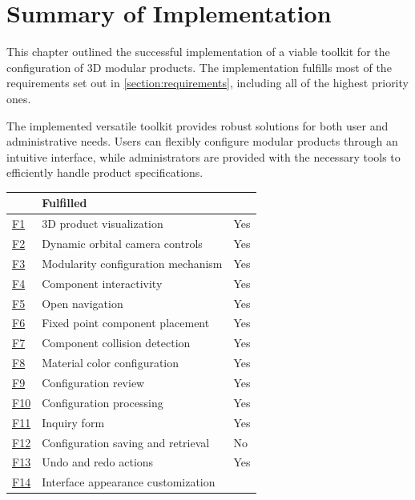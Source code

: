 \section{Summary of Implementation}

This chapter outlined the successful implementation of a viable toolkit for the configuration of 3D modular products. The implementation fulfills most of the requirements set out in \autoref{section:requirements}, including all of the highest priority ones.

The implemented versatile toolkit provides robust solutions for both user and administrative needs. Users can flexibly configure modular products through an intuitive interface, while administrators are provided with the necessary tools to efficiently handle product specifications.

\begin{table}[htb]
\centering
\begin{tabular}{>{\raggedright\arraybackslash}p{0.5cm} >{\raggedright\arraybackslash}p{8cm} >{\centering\arraybackslash}p{2cm}}
\toprule
\multicolumn{2}{c}{\textbf{Requirement}} &
\textbf{Fulfilled}\\ 
\midrule
\hyperref[itm:F1]{F1} & 3D product visualization &
    Yes \\
\hyperref[itm:F2]{F2} & Dynamic orbital camera controls &
    Yes \\
\hyperref[itm:F3]{F3} & Modularity configuration mechanism &
    Yes \\
\hyperref[itm:F4]{F4} & Component interactivity &
    Yes \\
\hyperref[itm:F5]{F5} & Open navigation &
    Yes \\
\hyperref[itm:F6]{F6} & Fixed point component placement &
    Yes \\
\hyperref[itm:F7]{F7} & Component collision detection &
    Yes \\
\hyperref[itm:F8]{F8} & Material color configuration &
    Yes \\
\hyperref[itm:F9]{F9} & Configuration review &
    Yes \\
\hyperref[itm:F10]{F10} & Configuration processing &
    Yes \\
\hyperref[itm:F11]{F11} & Inquiry form &
    Yes \\
\hyperref[itm:F12]{F12} & Configuration saving and retrieval &
    No \\
\hyperref[itm:F13]{F13} & Undo and redo actions &
    Yes \\
\hyperref[itm:F14]{F14} & Interface appearance customization &

\end{tabular}
\end{table}
